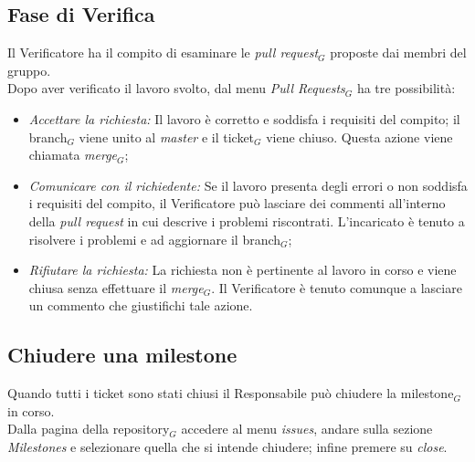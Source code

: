 \subsection{Fase di Verifica}
Il Verificatore ha il compito di esaminare le \textit{pull request}$_G$ proposte dai membri del gruppo.\\
Dopo aver verificato il lavoro svolto, dal menu \textit{Pull Requests}$_G$ ha tre possibilità:
\begin{itemize}
\item \textit{Accettare la richiesta:} Il lavoro è corretto e soddisfa i requisiti del compito; il branch$_G$ viene unito al \textit{master} e il ticket$_G$ viene chiuso. Questa azione viene chiamata \textit{merge}$_G$;
\item \textit{Comunicare con il richiedente:} Se il lavoro presenta degli errori o non soddisfa i requisiti del compito, il Verificatore può lasciare dei commenti all'interno della \textit{pull request} in cui descrive i problemi riscontrati. L'incaricato è tenuto a risolvere i problemi e ad aggiornare il branch$_G$;
\item \textit{Rifiutare la richiesta:} La richiesta non è pertinente al lavoro in corso e viene chiusa senza effettuare il \textit{merge}$_G$. Il Verificatore è tenuto comunque a lasciare un commento che giustifichi tale azione.
\end{itemize}

\subsection{Chiudere una milestone}
Quando tutti i ticket sono stati chiusi il Responsabile può chiudere la milestone$_G$ in corso. \\
Dalla pagina della repository$_G$ accedere al menu \textit{issues}, andare sulla sezione \textit{Milestones} e selezionare quella che si intende chiudere; infine premere su \textit{close}.